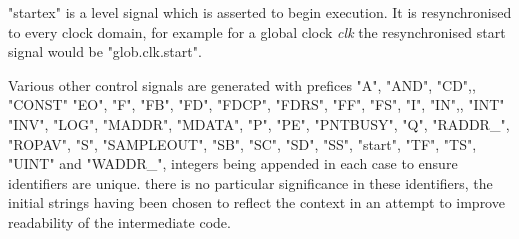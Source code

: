            "startex" is a level signal which is asserted to begin
            execution. It is resynchronised to every clock domain, for example
            for a global clock {\em clk} the resynchronised start signal
            would be "glob.clk.start".

            Various other control signals are generated with prefices
            "A", "AND", "CD",, "CONST" "EO", "F", "FB", "FD", "FDCP", "FDRS",
            "FF", "FS", "I", "IN",, "INT" "INV", "LOG", "MADDR", "MDATA", "P",
            "PE", "PNTBUSY", "Q", "RADDR\_", "ROPAV", "S", "SAMPLEOUT", "SB",
            "SC", "SD", "SS", "start", "TF", "TS", "UINT" and "WADDR\_", integers
            being appended in each case to ensure identifiers are unique. there
            is no particular significance in these identifiers, the initial
            strings having been chosen to reflect the context in an attempt
            to improve readability of the intermediate code.

